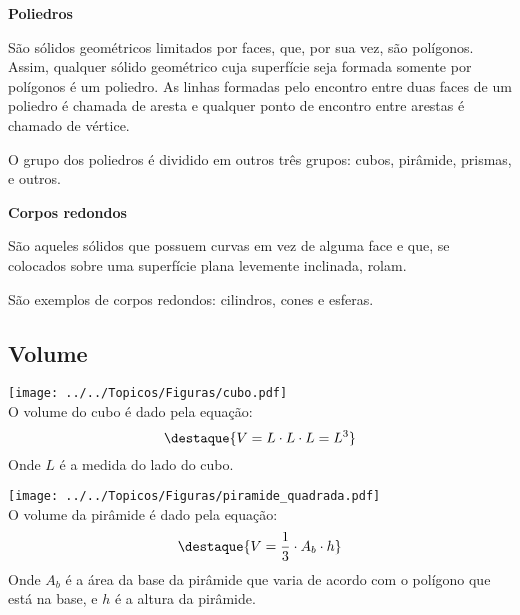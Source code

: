 \begin{figure}[H]
\center
{}
\qquad
{}
\qquad
{}
\qquad
{}

\end{figure}


 \textbf{Poliedros}

 São sólidos geométricos limitados por faces, que, por sua vez, são polígonos. Assim, qualquer sólido geométrico cuja superfície seja formada somente por polígonos é um poliedro. As linhas formadas pelo encontro entre duas faces de um poliedro é chamada de aresta e qualquer ponto de encontro entre arestas é chamado de vértice.

O grupo dos poliedros é dividido em outros três grupos: cubos, pirâmide, prismas, e outros.

\textbf{Corpos redondos}

São aqueles sólidos que possuem curvas em vez de alguma face e que, se colocados sobre uma superfície plana levemente inclinada, rolam.

São exemplos de corpos redondos: cilindros, cones e esferas.

 \newpage
\subsection{Volume}

\begin{multicols}{2}
 \texttt{[image: ../../Topicos/Figuras/cubo.pdf]} \\

 O volume do cubo é dado pela equação:
 \[\destaque{V= L \cdot L \cdot L= L^3} \]
 Onde $L$ é a medida do lado do cubo.
\end{multicols}

\begin{multicols}{2}
 \texttt{[image: ../../Topicos/Figuras/piramide\_quadrada.pdf]} \\
 O volume da pirâmide é dado pela equação:
 \[\destaque{V= \frac{1}{3} \cdot A_b \cdot h }\]
 Onde $A_b$ é a área da base da pirâmide que varia de acordo com o polígono que está na base, e $h$ é a altura da pirâmide.
\end{multicols}

